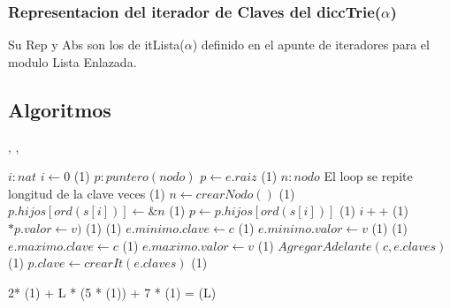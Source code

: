 \subsubsection{Representacion del iterador de Claves del diccTrie($\alpha$)}

Su Rep y Abs son los de itLista($\alpha$) definido en el apunte de iteradores para el modulo Lista Enlazada.

\subsection{Algoritmos}

{   ,
    ,
    }
{}{}
{
	\var $i : nat$
	\State $ i \gets 0$  												\comment \bigo(1) 
	\var $p : puntero(nodo)$ 
	\State $ p \gets e.raiz$											\comment \bigo(1) 
	\var $n : nodo$ 
   		\Statex             \comment El loop se repite longitud de la clave veces
     	                     			\comment \bigo(1)
        \State $n \gets crearNodo()$      							\comment \bigo(1)
        \State $p.hijos[ord(s[i])] \gets \&n$              			\comment \bigo(1)
     	\EndIf
     	\State $p \gets p.hijos[ord(s[i])]$								\comment \bigo(1)
     	\State $i++$   													\comment \bigo(1) 
  \EndWhile		
	\State $*p.valor \gets v)$										\comment \bigo(1)
                       					\comment \bigo(1)
    \State $e.minimo.clave \gets c$     				 	\comment \bigo(1)
    \State $e.minimo.valor \gets v$     				 \comment \bigo(1)
  \EndIf	
                       					\comment \bigo(1)
    \State $e.maximo.clave \gets c$     				 	\comment \bigo(1)
    \State $e.maximo.valor \gets v$     				 	\comment \bigo(1)
  \EndIf
  \State $AgregarAdelante(c, e.claves)$					 \comment \bigo(1)
  \State $p.clave \gets crearIt(e.claves)$        \comment \bigo(1)

}	{  2* \bigo(1) + L * (5 * \bigo(1)) + 7 * \bigo(1) = \bigo(L) }

